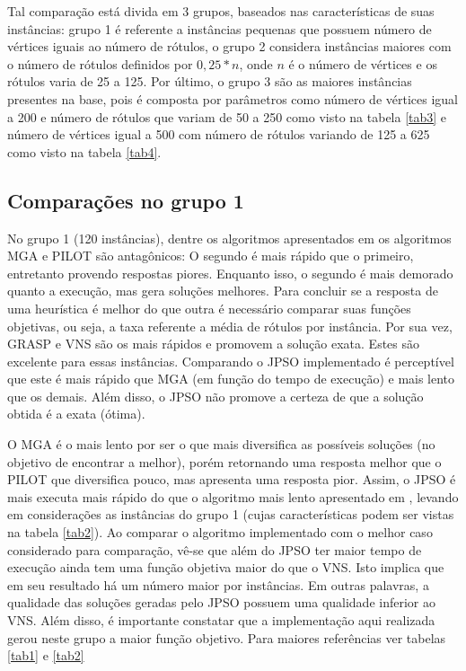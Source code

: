 \documentclass{sig-alternate-05-2015}
\begin{document}
Tal comparação está divida em 3 grupos, baseados nas características de suas instâncias: grupo 1 é referente a instâncias pequenas que possuem número de
vértices iguais ao número de rótulos, o grupo 2 considera instâncias maiores com o número de rótulos definidos por $0,25 * n$, onde $n$ é o número de vértices
e os rótulos varia de 25 a 125. Por último, o grupo 3 são as maiores instâncias presentes na base, pois é composta por parâmetros como número de vértices
igual a 200 e número de rótulos que variam de 50 a 250 como visto na tabela \ref{tab3} e número de vértices igual a 500 com número de rótulos variando de 125
a 625 como visto na tabela \ref{tab4}.
\subsection{Comparações no grupo 1}
No grupo 1 (120 instâncias), dentre os algoritmos apresentados em \cite{consoli2009greedy} os algoritmos MGA e PILOT são antagônicos: O segundo é mais rápido
que o primeiro, entretanto provendo respostas piores. Enquanto isso, o segundo é mais demorado quanto a execução, mas gera soluções melhores. Para concluir se a resposta de uma heurística é melhor do que outra é necessário comparar suas funções objetivas, ou seja, a taxa referente a média de rótulos por instância. Por sua vez, GRASP
e VNS são os mais rápidos e promovem a solução exata. Estes são excelente para essas instâncias. Comparando o JPSO implementado é perceptível que este é
mais rápido que MGA (em função do tempo de execução) e mais lento que os demais. Além disso, o JPSO não promove a certeza de que a solução obtida é a exata
(ótima).

O MGA é o mais lento por ser o que mais diversifica as possíveis soluções (no objetivo de encontrar a melhor), porém retornando uma resposta melhor que o PILOT
que
diversifica pouco, mas apresenta uma resposta pior. Assim, o JPSO é mais executa mais rápido do que o algoritmo mais lento apresentado em \cite{consoli2009greedy}
, levando em considerações as instâncias do grupo 1 (cujas características podem ser vistas na tabela \ref{tab2}). 
Ao comparar o algoritmo implementado com o melhor caso considerado para comparação, vê-se que além  do JPSO ter maior tempo de execução ainda tem uma função objetiva maior do que o VNS. Isto implica que em seu resultado há um número maior por instâncias. Em outras palavras, a qualidade das soluções geradas pelo JPSO possuem uma qualidade inferior ao VNS. Além disso, é importante constatar que a implementação aqui realizada gerou neste grupo a maior função objetivo. Para maiores referências ver tabelas \ref{tab1} e \ref{tab2}
\end{document}
